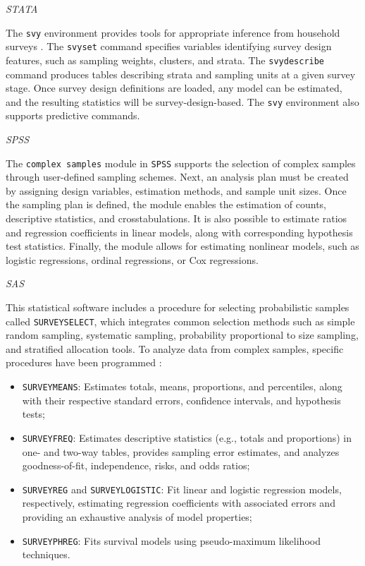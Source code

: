 \documentclass[
  12pt,
]{book}
\providecommand{\tightlist}{%
  \setlength{\itemsep}{0pt}\setlength{\parskip}{0pt}}
\begin{document}
\emph{STATA}

The \texttt{svy} environment provides tools for appropriate inference from household surveys \citep{STATA_2017}. The \texttt{svyset} command specifies variables identifying survey design features, such as sampling weights, clusters, and strata. The \texttt{svydescribe} command produces tables describing strata and sampling units at a given survey stage. Once survey design definitions are loaded, any model can be estimated, and the resulting statistics will be survey-design-based. The \texttt{svy} environment also supports predictive commands.

\emph{SPSS}

The \texttt{complex\ samples} module in \texttt{SPSS} \citep{IBM_2017} supports the selection of complex samples through user-defined sampling schemes. Next, an analysis plan must be created by assigning design variables, estimation methods, and sample unit sizes. Once the sampling plan is defined, the module enables the estimation of counts, descriptive statistics, and crosstabulations. It is also possible to estimate ratios and regression coefficients in linear models, along with corresponding hypothesis test statistics. Finally, the module allows for estimating nonlinear models, such as logistic regressions, ordinal regressions, or Cox regressions.

\emph{SAS}

This statistical software includes a procedure for selecting probabilistic samples called \texttt{SURVEYSELECT}, which integrates common selection methods such as simple random sampling, systematic sampling, probability proportional to size sampling, and stratified allocation tools. To analyze data from complex samples, specific procedures have been programmed \citep{SAS_2017}:

\begin{itemize}
\tightlist
\item
  \texttt{SURVEYMEANS}: Estimates totals, means, proportions, and percentiles, along with their respective standard errors, confidence intervals, and hypothesis tests;
\item
  \texttt{SURVEYFREQ}: Estimates descriptive statistics (e.g., totals and proportions) in one- and two-way tables, provides sampling error estimates, and analyzes goodness-of-fit, independence, risks, and odds ratios;
\item
  \texttt{SURVEYREG} and \texttt{SURVEYLOGISTIC}: Fit linear and logistic regression models, respectively, estimating regression coefficients with associated errors and providing an exhaustive analysis of model properties;
\item
  \texttt{SURVEYPHREG}: Fits survival models using pseudo-maximum likelihood techniques.
\end{itemize}
\end{document}
